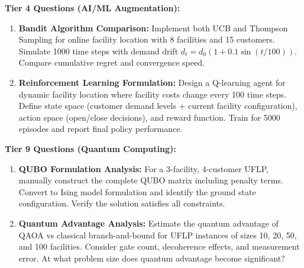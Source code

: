 \documentclass{article}
\begin{document}
\textbf{Tier 4 Questions (AI/ML Augmentation):}

\begin{enumerate}
\item \textbf{Bandit Algorithm Comparison:} Implement both UCB and Thompson Sampling for online facility location with 8 facilities and 15 customers. Simulate 1000 time steps with demand drift $d_t = d_0(1 + 0.1\sin(t/100))$. Compare cumulative regret and convergence speed.

\item \textbf{Reinforcement Learning Formulation:} Design a Q-learning agent for dynamic facility location where facility costs change every 100 time steps. Define state space (customer demand levels + current facility configuration), action space (open/close decisions), and reward function. Train for 5000 episodes and report final policy performance.
\end{enumerate}

\textbf{Tier 9 Questions (Quantum Computing):}

\begin{enumerate}
\item \textbf{QUBO Formulation Analysis:} For a 3-facility, 4-customer UFLP, manually construct the complete QUBO matrix including penalty terms. Convert to Ising model formulation and identify the ground state configuration. Verify the solution satisfies all constraints.

\item \textbf{Quantum Advantage Analysis:} Estimate the quantum advantage of QAOA vs classical branch-and-bound for UFLP instances of sizes 10, 20, 50, and 100 facilities. Consider gate count, decoherence effects, and measurement error. At what problem size does quantum advantage become significant?
\end{enumerate}
\end{document}
